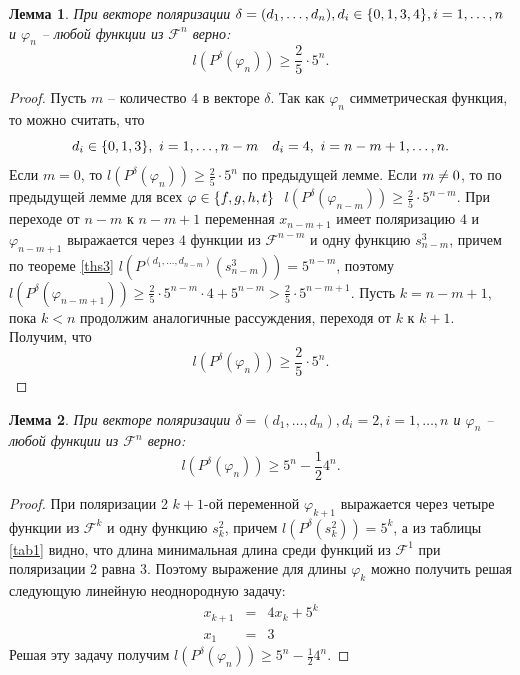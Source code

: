 \documentclass[bibliography=totoc, a4paper, 14pt]{extarticle}
\newtheorem{mylm}{Лемма}
\newcommand{\pphi}[1] {P^{\delta}(\varphi_{#1})}
\def\neq{\not=\nobreak\discretionary{}{\usefont{OMS}{cmsy}{m}{n}\char54\usefont{OT1}{cmr}{m}{n}\char61}{}}
\def\in{\mathchar"3232\nobreak\discretionary{}{\usefont{OMS}{cmsy}{m}{n}\char50}{}}
\begin{document}
\begin{mylm}
При векторе поляризации $\delta = (d_1,\dots,d_n), d_i \in \{0,1,3,4\}, i = 1,\dots,n$ и
$\varphi_n$ -- любой функции из $\mathcal{F}^n$ верно:
$$l(\pphi{n}) \geqslant \frac{2}{5} \cdot 5^n.$$
\end{mylm}
\begin{proof}
Пусть $m$ -- количество $4$ в векторе $\delta$.
Так как $\varphi_n$ симметрическая функция, то можно считать, что
$$d_i \in \{0,1,3\},\ i=1,\dots,n-m \quad d_i = 4,\ i=n-m+1,\dots,n.$$
Если $m=0$, то $l(\pphi{n}) \geqslant \frac{2}{5} \cdot 5^n$ по предыдущей лемме.
Если $m \neq 0$, то по предыдущей лемме для всех $\varphi \in \{f,g,h,t\}\ $
$l(\pphi{n-m}) \geqslant \frac{2}{5} \cdot 5^{n-m}$. При переходе от ${n-m}$ к ${n-m+1}$ переменная
$x_{n-m+1}$ имеет поляризацию $4$ и $\varphi_{n-m+1}$ выражается через $4$ функции из
$\mathcal{F}^{n-m}$ и одну функцию $s^3_{n-m}$, причем по теореме \ref{ths3}
$l(P^{(d_1,\dots,d_{n-m})}(s^3_{n-m})) = 5^{n-m}$, поэтому
$l(\pphi{n-m+1}) \geqslant \frac{2}{5}\cdot5^{n-m}\cdot4+5^{n-m}>\frac{2}{5}\cdot5^{n-m+1}$. Пусть
$k=n-m+1$, пока $k<n$ продолжим аналогичные рассуждения, переходя от $k$ к $k+1$. Получим, что
$$l(\pphi{n}) \geqslant \frac{2}{5} \cdot 5^n.$$
\end{proof}

\begin{mylm}
\label{lm2l}
При векторе поляризации $\delta = (d_1,\dots,d_n), d_i = 2, i = 1,\dots,n$ и
$\varphi_n$ -- любой функции из $\mathcal{F}^n$ верно:
$$l(\pphi{n}) \geqslant 5^n - \frac{1}{2}4^n.$$
\end{mylm}
\begin{proof}
При поляризации 2 $k+1$-ой переменной $\varphi_{k+1}$ выражается через четыре функции из
$\mathcal{F}^k$ и одну функцию $s^2_k$, причем $l(P^{\delta}(s^2_k)) = 5^k$, а из таблицы
\ref{tab1} видно, что длина минимальная длина среди функций из $\mathcal{F}^1$ при поляризации 2
равна 3. Поэтому выражение для длины $\varphi_k$ можно получить решая следующую линейную
неоднородную задачу:
$$ \begin{array}{lcl}
x_{k+1} &=& 4 x_k + 5^k \\
x_1     &=& 3 
\end{array} $$
Решая эту задачу получим $l(\pphi{n}) \geqslant 5^n - \frac{1}{2}4^n$.
\end{proof}
\end{document}
